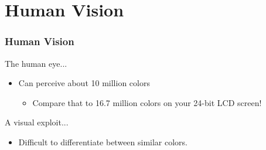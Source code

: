 \documentclass{beamer}
\begin{document}
\section{Human Vision}
\begin{frame}
   \frametitle{Human Vision}
   The human eye...
   \begin{figure}[!htbp]
   \begin{center}
   \end{center}
   \end{figure}
   
   \begin{itemize}
   \item{Can perceive about 10 million colors}
   \begin{itemize}
      \item{Compare that to 16.7 million colors on your 24-bit LCD screen!}
   \end{itemize}
   \end{itemize}
\end{frame}

\begin{frame}
   A visual exploit...
   \begin{itemize}
   \item{Difficult to differentiate between similar colors.}
   \end{itemize}
\end{frame}
\end{document}

